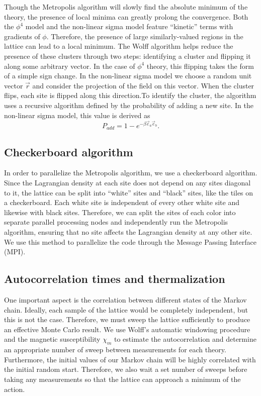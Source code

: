 \documentclass[12pt]{report}
\newcommand{\citeneeded}{}
\begin{document}
Though the Metropolis algorithm will slowly find the absolute minimum of the theory, the presence of local minima can greatly prolong the convergence. Both the $\phi^4$ model and the non-linear sigma model feature ``kinetic'' terms with gradients of $\phi$. Therefore, the presence of large similarly-valued regions in the lattice can lead to a local minimum. The Wolff algorithm helps reduce the presence of these clusters through two steps: identifying a cluster and flipping it along some arbitrary vector. In the case of $\phi^4$ theory, this flipping takes the form of a simple sign change. In the non-linear sigma model we choose a random unit vector $\vec r$ and consider the projection of the field on this vector. When the cluster flips, each site is flipped along this direction.\citeneeded To identify the cluster, the algorithm uses a recursive algorithm defined by the probability of adding a new site. In the non-linear sigma model, this value is derived as 
\begin{equation}
    P_{add} = 1-e^{- \beta \vec e_a\vec e_b}.
\end{equation}


\subsection{Checkerboard algorithm}

In order to parallelize the Metropolis algorithm, we use a checkerboard algorithm. Since the Lagrangian density at each site does not depend on any sites diagonal to it, the lattice can be split into ``white'' sites and ``black'' sites, like the tiles on a checkerboard. Each white site is independent of every other white site and likewise with black sites. Therefore, we can split the sites of each color into separate parallel processing nodes and independently run the Metropolis algorithm, ensuring that no site affects the Lagrangian density at any other site. We use this method to parallelize the code through the Message Passing Interface (MPI).

\subsection{Autocorrelation times and thermalization}
One important aspect is the correlation between different states of the Markov chain. Ideally, each sample of the lattice would be completely independent, but this is not the case. Therefore, we must sweep the lattice sufficiently to produce an effective Monte Carlo result. We use Wolff's automatic windowing procedure \cite{wolff2007} and the magnetic susceptibility $\chi_m$ to estimate the autocorrelation and determine an appropriate number of sweep between measurements for each theory. Furthermore, the initial values of our Markov chain will be highly correlated with the initial random start. Therefore, we also wait a set number of sweeps before taking any measurements so that the lattice can approach a minimum of the action.
\end{document}
